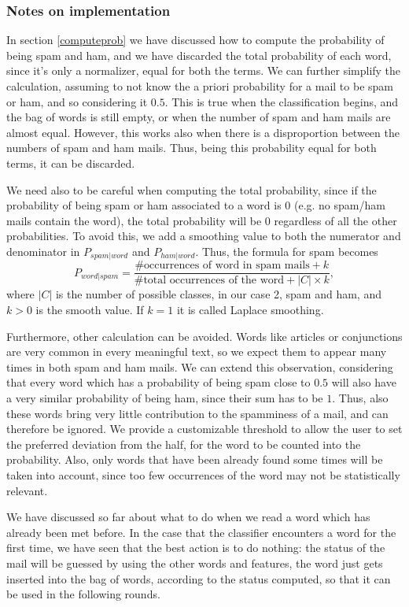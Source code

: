 \subsubsection{Notes on implementation}
\label{notesonimpl} In section \ref{computeprob} we have discussed how to compute the probability of being spam and ham, and we have discarded the total probability of each word, since it's only a normalizer, equal for both the terms. We can further simplify the calculation, assuming to not know the a priori probability for a mail to be spam or ham, and so considering it $0.5$. This is true when the classification begins, and the bag of words is still empty, or when the number of spam and ham mails are almost equal. However, this works also when there is a disproportion between the numbers of spam and ham mails. Thus, being this probability equal for both terms, it can be discarded.

We need also to be careful when computing the total probability, since if the probability of being spam or ham associated to a word is $0$ (e.g. no spam/ham mails contain the word), the total probability will be $0$ regardless of all the other probabilities. To avoid this, we add a smoothing value to both the numerator and denominator in $P_{spam|word}$ and $P_{ham|word}$. Thus, the formula for spam becomes $$P_{word|spam} = \frac{\mbox{\# occurrences of word in spam mails} + k}{\mbox{\# total occurrences of the word} + |C|\times k},$$ where $|C|$ is the number of possible classes, in our case 2, spam and ham, and $k > 0$ is the smooth value. If $k=1$ it is called Laplace smoothing.

Furthermore, other calculation can be avoided. Words like articles or conjunctions are very common in every meaningful text, so we expect them to appear many times in both spam and ham mails. We can extend this observation, considering that every word which has a probability of being spam close to $0.5$ will also have a very similar probability of being ham, since their sum has to be $1$. Thus, also these words bring very little contribution to the spamminess of a mail, and can therefore be ignored. We provide a customizable threshold to allow the user to set the preferred deviation from the half, for the word to be counted into the probability. Also, only words that have been already found some times will be taken into account, since too few occurrences of the word may not be statistically relevant.

We have discussed so far about what to do when we read a word which has already been met before. In the case that the classifier encounters a word for the first time, we have seen that the best action is to do nothing: the status of the mail will be guessed by using the other words and features, the word just gets inserted into the bag of words, according to the status computed, so that it can be used in the following rounds.
